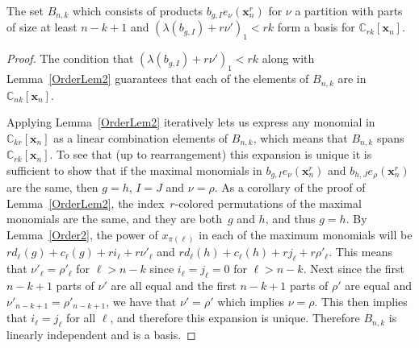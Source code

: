 \documentclass[10pt]{article}
\begin{document}
\begin{prop}
\label{BasisProp2}

	The set $B_{n,k}$ which consists of products $b_{g,I}e_\nu(\mathbf{x}_n^r)$ for $\nu$ a partition with parts of size at 
least $n-k+1$ and $(\lambda(b_{g,I})+r\nu')_1<rk$ form a basis for $\mathbb{C}_{rk}[\mathbf{x}_n]$.
	\begin{proof}

The condition that $(\lambda(b_{g,I})+r\nu')_1<rk$ along with Lemma~\ref{OrderLem2} guarantees that each of the elements of 
$B_{n,k}$ are in $\mathbb{C}_{nk}[\mathbf{x}_n]$.

Applying Lemma~\ref{OrderLem2} iteratively lets us express any monomial in $\mathbb{C}_{kr}[\mathbf{x}_n]$ as a linear 
combination elements of $B_{n,k}$, which means that $B_{n,k}$ spans $\mathbb{C}_{rk}[\mathbf{x}_n]$. To see that (up to 
rearrangement) this expansion is unique it is sufficient to show that if the maximal monomials in 
$b_{g,I}e_{\nu}(\mathbf{x}_n^r)$ and $b_{h,J}e_{\rho}(\mathbf{x}_n^r)$ are the same, then $g=h$, $I=J$ and $\nu=\rho$. As a 
corollary of the proof of Lemma~\ref{OrderLem2}, the index~$r$-colored permutations of the maximal monomials are the same, 
and they are both~$g$ and $h$, and thus $g=h$. By Lemma~\ref{Order2}, the power of $x_{\pi(\ell)}$ in each of the maximum 
monomials will be $rd_\ell(g)+c_\ell(g)+ri_\ell+r\nu'_\ell$ and $rd_\ell(h)+c_\ell(h)+rj_\ell+r\rho'_\ell$. This means that 
$\nu'_\ell=\rho'_\ell$ for $\ell>n-k$ since $i_\ell=j_\ell=0$ for $\ell>n-k$. Next since the first $n-k+1$ parts of $\nu'$ 
are all equal and the first $n-k+1$ parts of $\rho'$ are equal and $\nu'_{n-k+1}=\rho'_{n-k+1}$, we have that $\nu'=\rho'$ 
which implies $\nu=\rho$. This then implies that $i_\ell=j_\ell$ for all $\ell$, and therefore this expansion is unique. 
Therefore $B_{n,k}$ is linearly independent and is a basis.
	\end{proof}

\end{prop}
	
\end{document}
